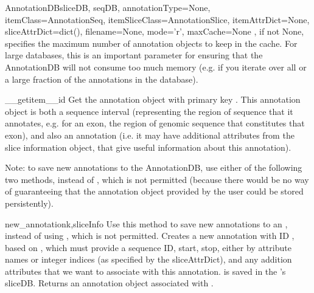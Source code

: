 \documentclass{howto}
\begin{document}
\begin{funcdesc}{AnnotationDB}{sliceDB, seqDB, annotationType=None, itemClass=AnnotationSeq, itemSliceClass=AnnotationSlice, itemAttrDict=None, sliceAttrDict=dict(), filename=None, mode='r', maxCache=None}
  , if not None, specifies the maximum number of annotation
  objects to keep in the cache.  For large databases, this is an important
  parameter for ensuring that the AnnotationDB will not consume too much
  memory (e.g. if you iterate over all or a large fraction of the annotations
  in the database).
\end{funcdesc}

\begin{funcdesc}{__getitem__}{id}
  Get the annotation object with primary key .  This annotation object
  is both a sequence interval (representing the region of sequence that it
  annotates, e.g. for an exon, the region of genomic sequence that constitutes
  that exon), and also an annotation (i.e. it may have additional attributes
  from the slice information object, that give useful information about this
  annotation).
\end{funcdesc}

Note: to save new annotations to the AnnotationDB, use either of the following two
methods, instead of , which is not permitted (because
there would be no way of guaranteeing that the annotation object provided
by the user could be stored persistently).
\begin{funcdesc}{new_annotation}{k,sliceInfo}
  Use this method to save new annotations to an ,
  instead of using , which is not permitted.
  Creates a new annotation with ID , based on ,
  which must provide a sequence ID, start, stop, either by attribute
  names or integer indices (as specified by the sliceAttrDict), 
  and any addition attributes that we want to associate with this annotation.
   is saved in the 's sliceDB.
  Returns an annotation object associated with .
\end{funcdesc}
\end{document}

